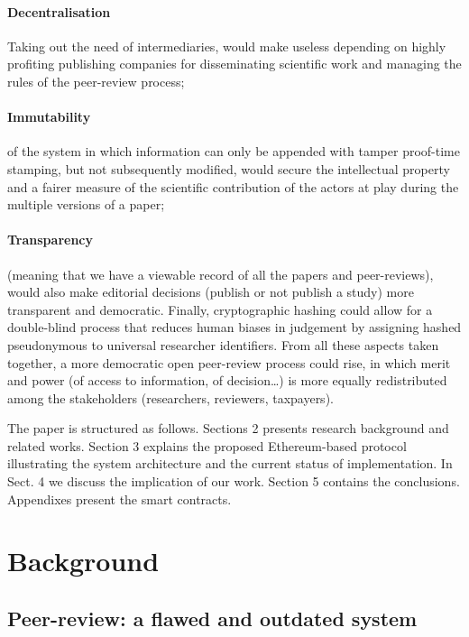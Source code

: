 \documentclass[runningheads]{llncs}
\begin{document}
\paragraph{Decentralisation}Taking out the need of intermediaries, would make useless depending on highly profiting publishing companies for disseminating scientific work and managing the rules of the peer-review process;
\paragraph{Immutability} of the system in which information can only be appended with tamper proof-time stamping,  but not subsequently modified, would secure the intellectual property and a fairer measure of the scientific contribution of the actors at play during the multiple versions of a paper;
\paragraph{Transparency} (meaning that we have a viewable record of all the papers and peer-reviews), would also make editorial decisions (publish or not publish a study) more transparent and democratic. Finally, cryptographic hashing could allow for a double-blind process that reduces human biases in judgement by assigning hashed pseudonymous to universal researcher identifiers. From all these aspects taken together, a more democratic open peer-review  process could rise, in which merit and power (of access to information, of decision…) is more equally redistributed among the stakeholders (researchers, reviewers, taxpayers).

\newline The paper is structured as follows. Sections 2 presents research background and related works. Section 3 explains the proposed Ethereum-based protocol illustrating the system architecture and the current status of implementation. In Sect. 4 we discuss the implication of our work. Section 5 contains the conclusions. Appendixes present the smart contracts. 

\section{Background}
\subsection{Peer-review: a flawed and outdated system}
\end{document}
